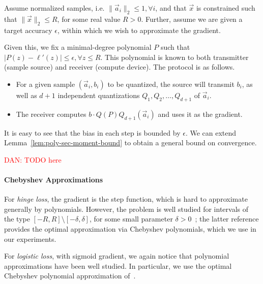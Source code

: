 Assume normalized samples, i.e. $\| \vec{a}_i \|_2 \leq 1, \forall i$, and that $\vec{x}$ is constrained such that $\| \vec{x} \|_2 \leq R$, for some real value $R > 0$. Further, assume we are given a target accuracy $\epsilon$, within which we wish to approximate the gradient. 

Given this, we fix a minimal-degree polynomial $P$ such that $|P(z) - \ell'(z)| \leq \epsilon, \forall z \leq R$. This polynomial is known to both transmitter (sample source) and receiver (compute device). The protocol is as follows. 
\begin{itemize}
	\item For a given sample $(\vec{a}_i, b_i)$ to be quantized, the source will transmit $b_i$, as well as $d + 1$ independent quantizations $Q_1, Q_2, \ldots, Q_{d + 1}$ of $\vec{a}_i$. 
	\item The receiver computes $b \cdot Q(P) Q_{d + 1} ( \vec{a}_i )$ and uses it as the gradient.
\end{itemize}

It is easy to see that the bias in each step is bounded by $\epsilon$. 
We can extend Lemma~\ref{lem:poly-sec-moment-bound} to obtain a general bound on convergence. 

\begin{lemma}
	\textcolor{red}{DAN: TODO here}
\end{lemma}

\paragraph{Chebyshev Approximations} 
For \emph{hinge loss}, the gradient is the step function, which is hard to approximate generally by polynomials. 
However, the problem is well studied for intervals of the type  $[-R, R] \setminus [-\delta, \delta]$, for some small parameter $\delta > 0$~\cite{frostig2016principal, allen2016faster}; the latter reference provides the optimal approximation via Chebyshev polynomials, which we use in our experiments. 

For \emph{logistic loss}, with sigmoid gradient, we again notice that polynomial approximations have been well studied. In particular, we use the optimal Chebyshev polynomial approximation of~\cite{vlcek2012chebyshev}. 

\iffalse
Figure~\ref{fig:approximation} shows how close the Chebyshev polynomial aprroximations with different degrees are to those two kind of functions.

\begin{figure}[h]
\centering
    \begin{subfigure}[h]{.4\columnwidth}
    \texttt{[image: micro-experiments/chebyshev\_sgn]} 
    \caption{sign function}
    \end{subfigure}
    \begin{subfigure}[h]{.4\columnwidth}
    \texttt{[image: micro-experiments/chebyshev\_sigmoid]} 
    \caption{sigmoid function}
    \end{subfigure}
\caption{Chebyshev approximation to gradient of hinge loss and logistic loss with different degrees}
\label{fig:approximation}
\end{figure} 
\fi

